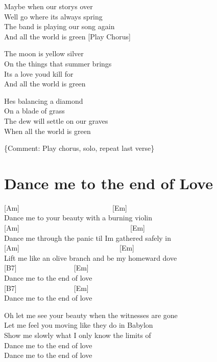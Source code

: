 \documentclass[
  letterpaper,
  twoside=false]{scrbook}
\begin{document}
Maybe when our story\textquotesingle s over\\
We\textquotesingle ll go where it\textquotesingle s always spring\\
The band is playing our song again\\
And all the world is green {[}Play Chorus{]}

The moon is yellow silver\\
On the things that summer brings\\
It\textquotesingle s a love you\textquotesingle d kill for\\
And all the world is green

He\textquotesingle s balancing a diamond\\
On a blade of grass\\
The dew will settle on our graves\\
When all the world is green

\{Comment: Play chorus, solo, repeat last verse\}

\hypertarget{dance-me-to-the-end-of-love}{%
\chapter{Dance me to the end of
Love}\label{dance-me-to-the-end-of-love}}

{[}Am{]}~~~~~~~~~~~~~~~~~~~~~~~~~~{[}Em{]}\\
Dance me to your beauty with a burning violin\\
{[}Am{]}~~~~~~~~~~~~~~~~~~~~~~~~~~~~~~~{[}Em{]}\\
Dance me through the panic \textquotesingle til I\textquotesingle m
gathered safely in\\
{[}Am{]}~~~~~~~~~~~~~~~~~~~~~~~~~~~~{[}Em{]}\\
Lift me like an olive branch and be my homeward dove\\
{[}B7{]}~~~~~~~~~~~~~~~~{[}Em{]}\\
Dance me to the end of love\\
{[}B7{]}~~~~~~~~~~~~~~~~{[}Em{]}\\
Dance me to the end of love

Oh let me see your beauty when the witnesses are gone\\
Let me feel you moving like they do in Babylon\\
Show me slowly what I only know the limits of\\
Dance me to the end of love\\
Dance me to the end of love
\end{document}
